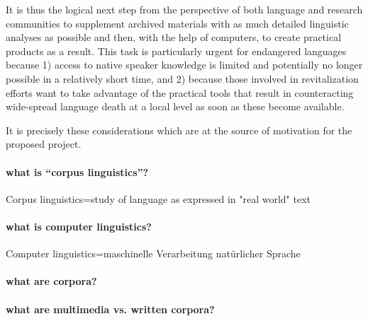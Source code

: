 \documentclass[a4paper,12pt]{article}
\begin{document}
It is thus the logical next step from the perspective of both language and research communities to supplement archived materials with as much detailed linguistic analyses as possible and then, with the help of computers, to create practical products as a result. This task is particularly urgent for endangered languages because 1) access to native speaker knowledge is limited and potentially no longer possible in a relatively short time, and 2) because those involved in revitalization efforts want to take advantage of the practical tools that result in counteracting wide-spread language death at a local level as soon as these become available.

It is precisely these considerations which are at the source of motivation for the proposed project.

\paragraph{what is “corpus linguistics”?} Corpus linguistics=study of language as expressed in "real world" text

\paragraph{what is computer linguistics?} Computer linguistics=maschinelle Verarbeitung natürlicher Sprache

\paragraph{what are corpora?}

\paragraph{what are multimedia vs. written corpora?}
\end{document}

